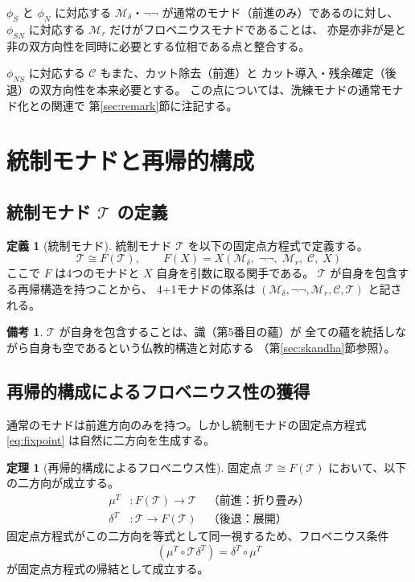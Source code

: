 \documentclass[11pt,a4paper]{article}
\newcommand{\Mr}{\mathcal{M}_r}
\newcommand{\Md}{\mathcal{M}_\delta}
\newcommand{\Mnn}{\neg\neg}
\newcommand{\MC}{\mathcal{C}}
\newcommand{\MT}{\mathcal{T}}
\theoremstyle{definition}
\newtheorem{definition}{定義}[section]
\newtheorem{theorem}{定理}[section]
\newtheorem{remark}{備考}[section]
\begin{document}
$\phi_S$ と $\phi_N$ に対応する $\Md$・$\Mnn$ が通常のモナド（前進のみ）であるのに対し、
$\phi_{SN}$ に対応する $\Mr$ だけがフロベニウスモナドであることは、
亦是亦非が是と非の双方向性を同時に必要とする位相である点と整合する。

$\phi_{NS}$ に対応する $\MC$ もまた、カット除去（前進）と
カット導入・残余確定（後退）の双方向性を本来必要とする。
この点については、洗練モナドの通常モナド化との関連で
第\ref{sec:remark}節に注記する。

\section{統制モナドと再帰的構成}
\label{sec:control}

\subsection{統制モナド $\MT$ の定義}

\begin{definition}[統制モナド]
統制モナド $\MT$ を以下の固定点方程式で定義する。
\begin{equation}
  \MT \cong F(\MT),\qquad
  F(X) = X(\Md,\;\Mnn,\;\Mr,\;\MC,\;X)
  \label{eq:fixpoint}
\end{equation}
ここで $F$ は4つのモナドと $X$ 自身を引数に取る関手である。
$\MT$ が自身を包含する再帰構造を持つことから、
4+1モナドの体系は $(\Md, \Mnn, \Mr, \MC, \MT)$ と記される。
\end{definition}

\begin{remark}
$\MT$ が自身を包含することは、識（第5番目の蘊）が
全ての蘊を統括しながら自身も空であるという仏教的構造と対応する
（第\ref{sec:skandha}節参照）。
\end{remark}

\subsection{再帰的構成によるフロベニウス性の獲得}

通常のモナドは前進方向のみを持つ。しかし統制モナドの固定点方程式
\eqref{eq:fixpoint} は自然に二方向を生成する。

\begin{theorem}[再帰的構成によるフロベニウス性]
固定点 $\MT \cong F(\MT)$ において、以下の二方向が成立する。
\begin{align}
  \mu^T &: F(\MT) \to \MT
    \quad\text{（前進：折り畳み）} \\
  \delta^T &: \MT \to F(\MT)
    \quad\text{（後退：展開）}
\end{align}
固定点方程式がこの二方向を等式として同一視するため、フロベニウス条件
\begin{equation}
  (\mu^T \circ \MT\delta^T) = \delta^T \circ \mu^T
  \label{eq:frobenius}
\end{equation}
が固定点方程式の帰結として成立する。
\end{theorem}
\end{document}
